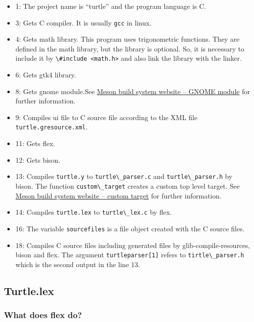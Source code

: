 \begin{itemize}
\tightlist
\item
  1: The project name is ``turtle'' and the program language is C.
\item
  3: Gets C compiler. It is usually \passthrough{\lstinline!gcc!} in
  linux.
\item
  4: Gets math library. This program uses trigonometric functions. They
  are defined in the math library, but the library is optional. So, it
  is necessary to include it by
  \passthrough{\lstinline!\#include <math.h>!} and also link the library
  with the linker.
\item
  6: Gets gtk4 library.
\item
  8: Gets gnome module.See
  \href{https://mesonbuild.com/Gnome-module.html\#gnome-module}{Meson
  build system website -- GNOME module} for further information.
\item
  9: Compiles ui file to C source file according to the XML file
  \passthrough{\lstinline!turtle.gresource.xml!}.
\item
  11: Gets flex.
\item
  12: Gets bison.
\item
  13: Compiles \passthrough{\lstinline!turtle.y!} to
  \passthrough{\lstinline!turtle\_parser.c!} and
  \passthrough{\lstinline!turtle\_parser.h!} by bison. The function
  \passthrough{\lstinline!custom\_target!} creates a custom top level
  target. See
  \href{https://mesonbuild.com/Reference-manual_functions.html\#custom_target}{Meson
  build system website -- custom target} for further information.
\item
  14: Compiles \passthrough{\lstinline!turtle.lex!} to
  \passthrough{\lstinline!turtle\_lex.c!} by flex.
\item
  16: The variable \passthrough{\lstinline!sourcefiles!} is a file
  object created with the C source files.
\item
  18: Compiles C source files including generated files by
  glib-compile-resources, bison and flex. The argument
  \passthrough{\lstinline!turtleparser[1]!} refers to
  \passthrough{\lstinline!tirtle\_parser.h!} which is the second output
  in the line 13.
\end{itemize}

\subsection{Turtle.lex}\label{turtle.lex}

\subsubsection{What does flex do?}\label{what-does-flex-do}

